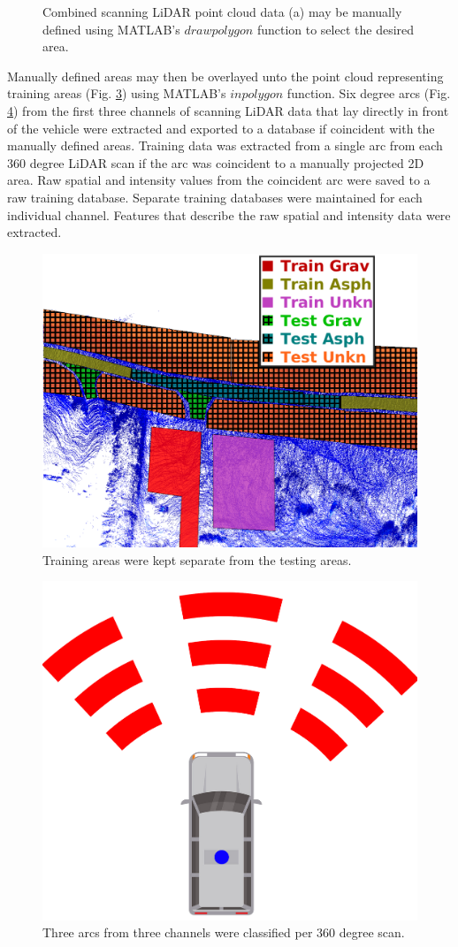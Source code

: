\documentclass[numbered,pdftex]{ohio-etd}
\begin{document}
{{\begin{figure}[H]
\begin{subfigure}{0.45\textwidth}
				\caption[Selected Road area on Point Cloud]{}
				\label{fig:area_selected}
			\end{subfigure}
			\caption[Manual Area Selection Process]{Combined scanning LiDAR point cloud data (a) may be manually defined using MATLAB's $drawpolygon$ function to select the desired area. }
			\label{fig:Area_Selection_Process}
		\end{figure}
	
		{Manually defined areas may then be overlayed unto the point cloud representing training areas (Fig. \ref{fig:test_vs_train_areas}) using MATLAB's $inpolygon$ function. Six degree arcs (Fig. \ref{fig:area_example}) from the first three channels of scanning LiDAR data that lay directly in front of the vehicle were extracted and exported to a database if coincident with the manually defined areas. Training data was extracted from a single arc from each 360 degree LiDAR scan if the arc was coincident to a manually projected 2D area. Raw spatial and intensity values from the coincident arc were saved to a raw training database. Separate training databases were maintained for each individual channel. Features that describe the raw spatial and intensity data were extracted. }
		
		\begin{figure}[H]
			\centering
			\includegraphics[width=0.95\linewidth]{Defense_Images/test_vs_train_areas_hatch}
			\caption[Training vs Testing Areas]{Training areas were kept separate from the testing areas.}
			\label{fig:test_vs_train_areas}
		\end{figure}
		
		\begin{figure}[H]
		\centering
		\includegraphics[width=0.25\linewidth]{Defense_Images/area_example}
		\caption[Areas to Classify]{Three arcs from three channels were classified per 360 degree scan. }
		\label{fig:area_example}
		\end{figure}
	
}}
\end{document}
